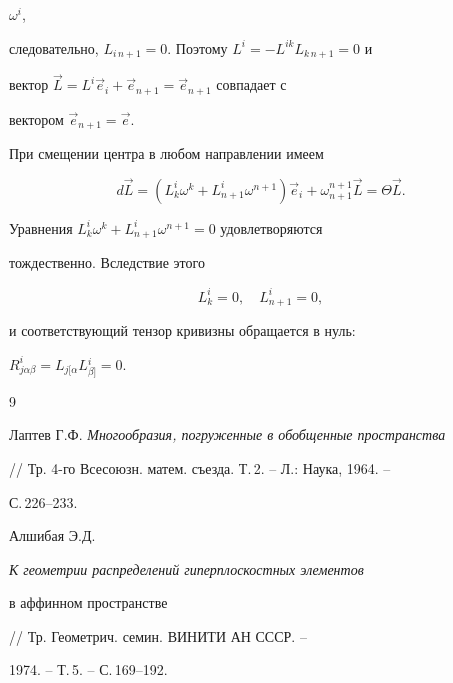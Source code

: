 $\omega^i$, 


следовательно, $L_{i\,n+1}=0$. Поэтому $L^i=-L^{i k}L_{k\,n+1}=0$ и 


вектор $\Vec L=L^i\Vec e_i+\Vec e_{n+1}=\Vec e_{n+1}$ совпадает с 


вектором $\Vec e_{n+1}=\Vec e$. 


 


При смещении центра в любом направлении имеем 


$$ 


d\Vec L=(L^i_k \omega^k+L^i_{n+1}\omega^{n+1}) 


\Vec e_i+\omega^{n+1}_{n+1}\Vec L=\Theta\Vec L. 


$$ 


Уравнения $L^i_k\omega^k+L^i_{n+1}\omega^{n+1}=0$ удовлетворяются 


тождественно. Вследствие этого 


$$ 


L^i_k=0,\quad L^i_{n+1}=0, 


$$ 


и соответствующий тензор кривизны обращается в нуль: 


$R^i_{j\alpha\beta}=L{}_{j[\alpha}L{}^i_{\beta]}=0$. 


 


 


\begin{thebibliography}{9} 


 




Лаптев Г.Ф. {\em Многообразия, погруженные в обобщенные пространства} 


// Тр. 4-го Всесоюзн. матем. съезда. Т.\,2. -- Л.: Наука, 1964. -- 


С.\,226--233. 




Алшибая Э.Д. {\em К геометрии распределений гиперплоскостных элементов 


в аффинном пространстве} // Тр. Геометрич. семин. ВИНИТИ АН СССР. -- 


1974. -- Т.\,5. -- С.\,169--192. 


 


 


\end{thebibliography} 


 


\vskip 2cm 


 






 


\label{end} 


 


